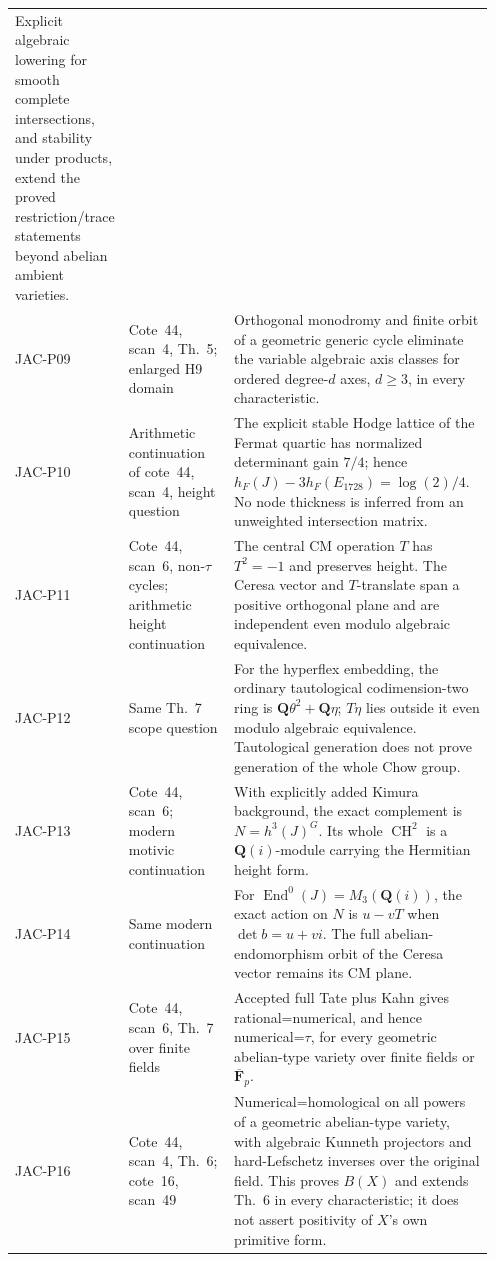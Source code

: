 \begin{longtable}{@{}p{0.12\linewidth}p{0.25\linewidth}p{0.58\linewidth}@{}}
Explicit algebraic lowering for smooth complete intersections,
and stability under products, extend the proved restriction/trace
statements beyond abelian ambient varieties.\\
JAC-P09 & Cote~44, scan~4, Th.~5; enlarged H9 domain &
Orthogonal monodromy and finite orbit of a geometric generic
cycle eliminate the variable algebraic axis classes for ordered
degree-$d$ axes, $d\ge3$, in every characteristic.\\
JAC-P10 & Arithmetic continuation of cote~44, scan~4, height question &
The explicit stable Hodge lattice of the Fermat quartic has
normalized determinant gain $7/4$; hence
$h_F(J)-3h_F(E_{1728})=\log(2)/4$. No node thickness is inferred
from an unweighted intersection matrix.\\
JAC-P11 & Cote~44, scan~6, non-$\tau$ cycles; arithmetic height continuation &
The central CM operation $T$ has $T^2=-1$ and preserves height.
The Ceresa vector and $T$-translate span a positive orthogonal
plane and are independent even modulo algebraic equivalence.\\
JAC-P12 & Same Th.~7 scope question &
For the hyperflex embedding, the ordinary tautological
codimension-two ring is $\mathbf Q\theta^2+\mathbf Q\eta$;
$T\eta$ lies outside it even modulo algebraic equivalence.
Tautological generation does not prove generation of the whole Chow group.\\
JAC-P13 & Cote~44, scan~6; modern motivic continuation &
With explicitly added Kimura background, the exact complement is
$N=h^3(J)^G$. Its whole $\operatorname{CH}^2$ is a
$\mathbf Q(i)$-module carrying the Hermitian height form.\\
JAC-P14 & Same modern continuation &
For $\operatorname{End}^0(J)=M_3(\mathbf Q(i))$, the exact action
on $N$ is $u-vT$ when $\det b=u+vi$. The full abelian-endomorphism
orbit of the Ceresa vector remains its CM plane.\\
JAC-P15 & Cote~44, scan~6, Th.~7 over finite fields &
Accepted full Tate plus Kahn gives rational=numerical, and hence
numerical=$\tau$, for every geometric abelian-type variety over
finite fields or $\overline{\mathbf F}_p$.\\
JAC-P16 & Cote~44, scan~4, Th.~6; cote~16, scan~49 &
Numerical=homological on all powers of a geometric abelian-type
variety, with algebraic Kunneth projectors and hard-Lefschetz
inverses over the original field. This proves $B(X)$ and extends
Th.~6 in every characteristic; it does not assert positivity of
$X$'s own primitive form.\\

\end{longtable}
